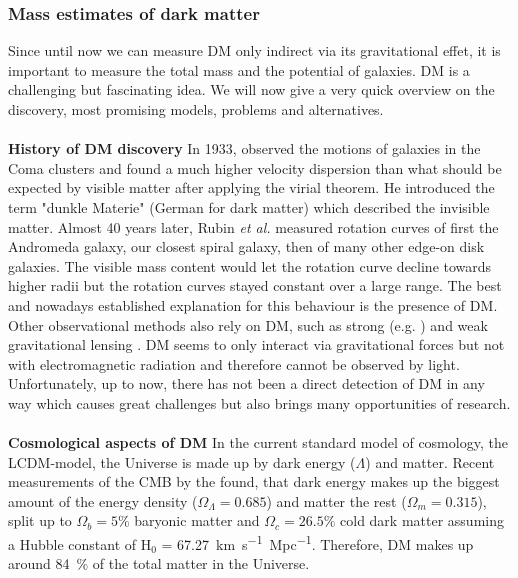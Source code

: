 \subsubsection{Mass estimates of dark matter}
Since until now we can measure \ac{DM} only indirect via its gravitational effet, it is important to measure the total mass and the potential of galaxies. \ac{DM} is a challenging but fascinating idea. We will now give a very quick overview on the discovery, most promising models, problems and alternatives. \\
\\\textbf{History of \ac{DM} discovery} In 1933, \citeauthor{Zwicky...DM...1933} observed the motions of galaxies in the Coma clusters and found a much higher velocity dispersion than what should be expected by visible matter after applying the virial theorem. He introduced the term "dunkle Materie" (German for dark matter) which described the invisible matter. Almost 40 years later, Rubin \textit{et al.} \citeyearpar{Rubin...DM...1970, Rubin...DM...1978, Rubin...DM...1980} measured rotation curves of first the Andromeda galaxy, our closest spiral galaxy, then of many other edge-on disk galaxies. The visible mass content would let the rotation curve decline towards higher radii but the rotation curves stayed constant over a large range. The best and nowadays established explanation for this behaviour is the presence of \ac{DM}. Other observational methods also rely on \ac{DM}, such as strong (e.g. \citep{Trick..stronglensing...2016}) and weak gravitational lensing \citep{Tyson...weaklensing...1990, Kaiser...weaklensing...1993}. \ac{DM} seems to only interact via gravitational forces but not with electromagnetic radiation and therefore cannot be observed by light. Unfortunately, up to now, there has not been a direct detection of \ac{DM} in any way which causes great challenges but also brings many opportunities of research.\\
\\\textbf{Cosmological aspects of \ac{DM}}
In the current standard model of cosmology, the \ac{LCDM}-model, the Universe is made up by dark energy ($\Lambda$) and matter. Recent measurements of the \ac{CMB} by the \citet{Planck...CMB...2018} found, that dark energy makes up the biggest amount of the energy density ($\Omega_\Lambda = 0.685$) and matter the rest ($\Omega_m = 0.315$), split up to $\Omega_b = 5\%$ baryonic matter and $\Omega_c = 26.5\%$ cold dark matter assuming a Hubble constant of H$_0$ =  \SI{67.27}{km.s^{-1}.Mpc^{-1}}. Therefore, \ac{DM} makes up around \SI{84}{\%} of the total matter in the Universe. \\

